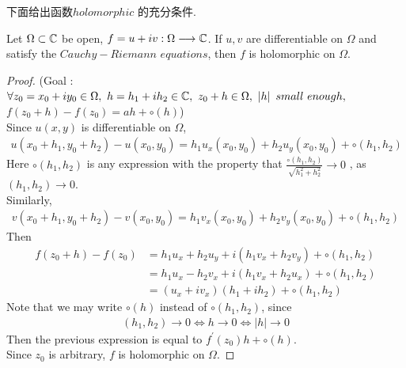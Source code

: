 	\vspace{2em}
	下面给出函数$holomorphic$ 的充分条件.
	\begin{thm}\label{thm 2.4.1}
		Let $\Omega \subset \mathbb{C}$ be open, $f = u + iv : \Omega \longrightarrow \mathbb{C}$. If $u , v$ are differentiable on $\Omega$ and satisfy the $Cauchy-Riemann \,\, equations$, then $f$ is holomorphic on $\Omega$.
		
		\vspace{2em}
		\begin{proof}
			(Goal : $\forall z_0 = x_0 + i y_0 \in \Omega , \,\, h = h_1 + i h_2 \in \mathbb{C} , \,\, z_0 + h \in \Omega , \,\, \left| h \right| \,\, small \,\, enough , $\\
			$f(z_0+  h) - f(z_0) = ah + \circ(h)$)\\
			
			\vspace{1em}
			Since $u(x , y)$ is differentiable on $\Omega$, 
			\begin{align}
				u(x_0 + h_1 , y_0 + h_2) - u(x_0 , y_0) = h_1 u_x(x_0 , y_0) + h_2 u_y(x_0 , y_0) + \circ(h_1 , h_2)
			\end{align}
			Here $\circ(h_1 , h_2)$ is any expression with the property that $\frac{\circ(h_1 , h_2)}{\sqrt{h_{1}^2 + h_{2}^2}} \to 0$ , as $(h_1 , h_2) \to 0$.\\
			Similarly, 
			\begin{align}
				v(x_0 + h_1 , y_0 + h_2) - v(x_0 , y_0) = h_1 v_x(x_0 , y_0) + h_2 v_y(x_0 , y_0) + \circ(h_1 , h_2)
			\end{align}
			Then
			\begin{align}
				f(z_0 + h) - f(z_0) 
				&= h_1 u_x + h_2 u_y + i (h_1 v_x + h_2 v_y) + \circ(h_1 , h_2) \\
				&= h_1 u_x - h_2 v_x + i (h_1 v_x + h_2 u_x) + \circ(h_1 , h_2) \\
				&= (u_x + i v_x)(h_1 + i h_2) + \circ(h_1 , h_2)
			\end{align}
			Note that we may write $\circ(h)$ instead of $\circ(h_1 , h_2)$, since
			\begin{align}
				(h_1 , h_2) \to 0 \Leftrightarrow h \to 0 \Leftrightarrow \left| h \right| \to 0
			\end{align}
			Then the previous expression is equal to $f^{'}(z_0)h + \circ(h)$.\\
			Since $z_0$ is arbitrary, $f$ is holomorphic on $\Omega$.
		\end{proof}
	\end{thm}
	
